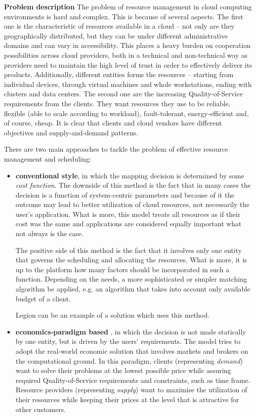 \begin{asparaenum}
  \item[\textbf{Problem description}]
The problem of resource management in cloud computing environments is hard and complex. This is because of several aspects. The first one is the characteristic of resources available in a cloud -- not only are they geographically distributed, but they can be under different administrative domains and can vary in accessibility. This places a heavy burden on cooperation possibilities across cloud providers, both in a technical and non-technical way as providers need to maintain the high level of trust in order to effectively  deliver its products. Additionally, different entities forms the resources -- starting from individual devices, through virtual machines and whole workstations, ending with clusters and data centers. The second one are the increasing Quality-of-Service requirements from the clients. They want resources they use to be reliable, flexible (able to scale according to workload), fault-tolerant, energy-efficient and, of course, cheap. It is clear that clients and cloud vendors have different objectives and supply-and-demand patterns.

There are two main approaches to tackle the problem of effective resource management and scheduling:
  \begin{itemize}
    \item \textbf{conventional style}, in which the mapping decision is determined by some \emph{cost function}. The downside of this method is the fact that in many cases the decision is a function of system-centric parameters \cite{buyya2002economic} and because of it the outcome may lead to better utilization of cloud resources, not necessarily the user's application. What is more, this model treats all resources as if their cost was the same and applications are considered equally important what not always is the case. 

      The positive side of this method is the fact that it involves only one entity that governs the scheduling and allocating the resources. What is more, it is up to the platform how many factors should be incorporated in such a function. Depending on the needs, a more sophisticated or simpler matching algorithm be applied, e.g. an algorithm that takes into account only available budget of a client.
      
      Legion \cite{chapin1999legion} can be an example of a solution which uses this method.
    \item \textbf{economics-paradigm based} \cite{buyya2001case}, in which the decision is not made statically by one entity, but is driven by the users' requirements. The model tries to adopt the real-world economic solution that involves markets and brokers on the computational ground. In this paradigm, clients (representing \emph{demand}) want to solve their problems at the lowest possible price while assuring required Quality-of-Service requirements and constraints, such as time frame. Resource providers (representing \emph{supply}) want to maximise the utilization of their resources while keeping their prices at the level that is attractive for other customers.
      

\end{itemize}
\end{asparaenum}
